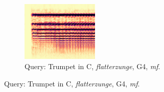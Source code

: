 \begin{figure}
        \begin{subfigure}{\linewidth}
                \centering
                \includegraphics[width=0.4\textwidth]{./figs/demo/TpC-flatt-G4-mf.png}
                \caption*{Query: Trumpet in C, \emph{flatterzunge}, G4, \emph{mf}.}
                \label{fig:TpC-flatt-G4-mf}
        \end{subfigure}%


\end{figure}

